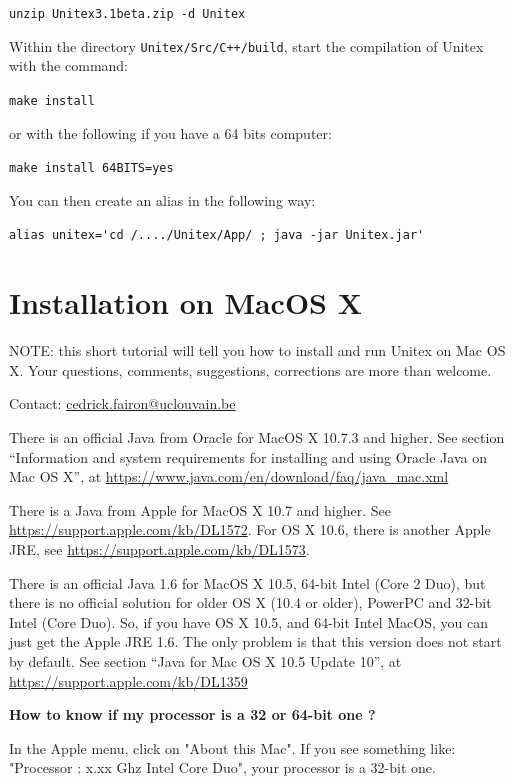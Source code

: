 \bigskip \noindent \verb$unzip Unitex3.1beta.zip -d Unitex$

\bigskip
\noindent Within the directory \verb|Unitex/Src/C++/build|, start the compilation
of Unitex with the command:

\bigskip \verb+make install+

\bigskip
\noindent or with the following if you have a 64 bits computer:
 
\bigskip \verb+make install 64BITS=yes+

\bigskip
\noindent You can then create an alias in the following way:

\bigskip \verb$alias unitex='cd /..../Unitex/App/ ; java -jar Unitex.jar'$


\section{Installation on MacOS X}
\label{section-macos-install}
\noindent NOTE: this short tutorial will tell you how to install and run 
Unitex on Mac OS X. Your questions, comments, suggestions, 
corrections are more than welcome. 

\noindent Contact: \url{cedrick.fairon@uclouvain.be}


\bigskip
\noindent There is an official Java from Oracle for MacOS X 10.7.3 and higher.
	See section ``Information and system requirements for installing and using Oracle Java on Mac OS X'', at \url{https://www.java.com/en/download/faq/java_mac.xml}



\bigskip
\noindent There is a Java from Apple for MacOS X 10.7 and higher.
	See \url{https://support.apple.com/kb/DL1572}. For OS X 10.6, there is another Apple JRE, see \url{https://support.apple.com/kb/DL1573}.

	
	
\bigskip
\noindent There is an official Java 1.6 for MacOS X 10.5, 64-bit Intel 
(Core 2 Duo), but there is no official solution for older OS X (10.4 or older),
PowerPC and 32-bit Intel (Core Duo). So,
 if you have OS X 10.5, and 64-bit Intel MacOS, you can just get the
    Apple JRE 1.6. The only problem is that this version does not start by
    default. See section ``Java for Mac OS X 10.5 Update 10'', 
    at \url{https://support.apple.com/kb/DL1359}

\noindent\textbf{How to know if my processor is a 32 or 64-bit one ?}

\noindent In the Apple menu, click on "About this Mac". If you see something
like: "Processor : x.xx Ghz Intel Core Duo", your processor is a 32-bit one.

